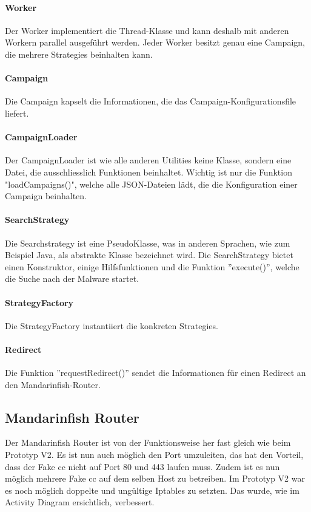 \paragraph{Worker}
Der Worker implementiert die Thread-Klasse und kann deshalb mit anderen Workern parallel ausgeführt werden. Jeder Worker besitzt genau eine Campaign, die mehrere Strategies beinhalten kann.

\paragraph{Campaign}
Die Campaign kapselt die Informationen, die das Campaign-Konfigurationsfile liefert.

\paragraph{CampaignLoader}
Der CampaignLoader ist wie alle anderen Utilities keine Klasse, sondern eine Datei, die ausschliesslich Funktionen beinhaltet. Wichtig ist nur die Funktion "loadCampaigns()", welche alle JSON-Dateien lädt, die die Konfiguration einer Campaign beinhalten.

\paragraph{SearchStrategy}
Die Searchstrategy ist eine PseudoKlasse, was in anderen Sprachen, wie zum Beispiel Java, als abstrakte Klasse bezeichnet wird. Die SearchStrategy bietet einen Konstruktor, einige Hilfsfunktionen und die Funktion ''execute()'', welche die Suche nach der Malware startet.

\paragraph{StrategyFactory}
Die StrategyFactory instantiiert die konkreten Strategies.

\paragraph{Redirect}
Die Funktion ''requestRedirect()'' sendet die Informationen für einen Redirect an den Mandarinfish-Router.


\subsection{Mandarinfish Router}
Der Mandarinfish Router ist von der Funktionsweise her fast gleich wie beim Prototyp V2. Es ist nun auch möglich den Port umzuleiten, das hat den Vorteil, dass der Fake \gls{cc} nicht auf Port 80 und 443 laufen muss. Zudem ist es nun möglich mehrere Fake \gls{cc} auf dem selben Host zu betreiben. Im Prototyp V2 war es noch möglich doppelte und ungültige Iptables zu setzten. Das  wurde, wie im Activity Diagram ersichtlich, verbessert.

